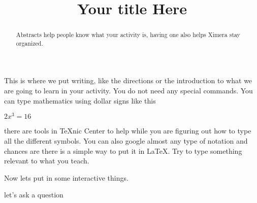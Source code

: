 \documentclass{ximera}%
\title{Your title Here}%
\begin{document}
\begin{abstract}
Abstracts help people know what your activity is, having one also helps Ximera stay organized.
\end{abstract}
\maketitle %
This is where we put writing, like the directions or the introduction to what we are going to learn in your activity. You do not need any special commands. You can type mathematics using dollar signs like this
 
$2x^3=16$

there are tools in TeXnic Center to help while you are figuring out how to type all the different symbols. You can also google almost any type of notation and chances are there is a simple way to put it in LaTeX. Try to type something relevant to what you teach.

Now lets put in some interactive things.

let's ask a question

\end{document}
